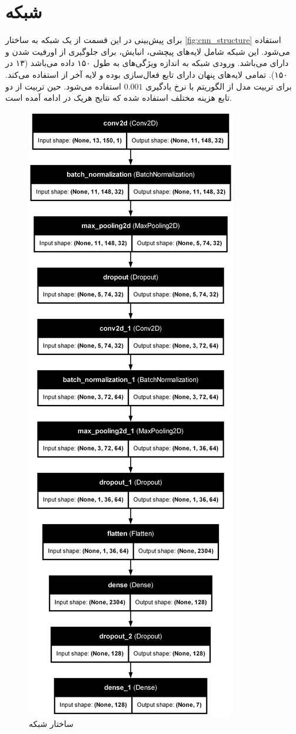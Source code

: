\documentclass[11pt]{article}
\begin{document}
	\section{شبکه }
	برای پیش‌بینی در این قسمت از یک شبکه  به ساختار 
	\autoref{fig:cnn_structure}
	استفاده می‌شود. این شبکه شامل لایه‌های پیچشی، انبایش،  برای جلوگیری از اورفیت شدن و دارای  می‌باشد. ورودی شبکه به اندازه ویژگی‌های  به طول ۱۵۰ داده می‌باشد (۱۳ در ۱۵۰). تمامی لایه‌های پنهان دارای تابع فعال‌سازی  بوده و لایه آخر از استفاده می‌کند. برای تربیت مدل از الگوریتم  با نرخ یادگیری $0.001$ استفاده می‌شود. حین تربیت از دو تابع هزینه مختلف استفاده شده که نتایج هریک در ادامه آمده است.\\
	\begin{figure}[htbp]
		\centerline{\includegraphics[width=0.3\linewidth]{../cnn_structure.png}}
		\caption{ساختار شبکه }
		\label{fig:cnn_structure}
	\end{figure}\\
\end{document}
